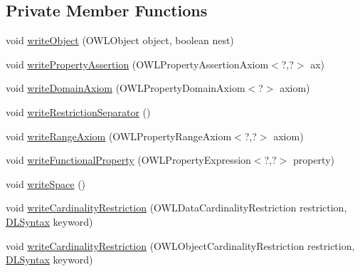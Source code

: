 \subsection*{Private Member Functions}
\begin{DoxyCompactItemize}
\item 
void \hyperlink{classuk_1_1ac_1_1manchester_1_1cs_1_1owlapi_1_1dlsyntax_1_1_d_l_syntax_object_renderer_a7c527eb066fc7968a25a907d0ff17556}{write\-Object} (O\-W\-L\-Object object, boolean nest)
\item 
void \hyperlink{classuk_1_1ac_1_1manchester_1_1cs_1_1owlapi_1_1dlsyntax_1_1_d_l_syntax_object_renderer_a010e7dc7a620747ab0d1276659905d87}{write\-Property\-Assertion} (O\-W\-L\-Property\-Assertion\-Axiom$<$?,?$>$ ax)
\item 
void \hyperlink{classuk_1_1ac_1_1manchester_1_1cs_1_1owlapi_1_1dlsyntax_1_1_d_l_syntax_object_renderer_ab97c5853612dd1b2d74799572f67f284}{write\-Domain\-Axiom} (O\-W\-L\-Property\-Domain\-Axiom$<$?$>$ axiom)
\item 
void \hyperlink{classuk_1_1ac_1_1manchester_1_1cs_1_1owlapi_1_1dlsyntax_1_1_d_l_syntax_object_renderer_a0934f412e95a40b712c2c0bebb4a4c35}{write\-Restriction\-Separator} ()
\item 
void \hyperlink{classuk_1_1ac_1_1manchester_1_1cs_1_1owlapi_1_1dlsyntax_1_1_d_l_syntax_object_renderer_ae16beea379abfc9b0b3ed4c8deee2921}{write\-Range\-Axiom} (O\-W\-L\-Property\-Range\-Axiom$<$?,?$>$ axiom)
\item 
void \hyperlink{classuk_1_1ac_1_1manchester_1_1cs_1_1owlapi_1_1dlsyntax_1_1_d_l_syntax_object_renderer_a1a5cdc270354bfe1a9de448de008d0eb}{write\-Functional\-Property} (O\-W\-L\-Property\-Expression$<$?,?$>$ property)
\item 
void \hyperlink{classuk_1_1ac_1_1manchester_1_1cs_1_1owlapi_1_1dlsyntax_1_1_d_l_syntax_object_renderer_ae97fe53c739b568dd43eb8a90e1fd3ca}{write\-Space} ()
\item 
void \hyperlink{classuk_1_1ac_1_1manchester_1_1cs_1_1owlapi_1_1dlsyntax_1_1_d_l_syntax_object_renderer_a91f8fbef16e0ee22bd456c33b4bcfd58}{write\-Cardinality\-Restriction} (O\-W\-L\-Data\-Cardinality\-Restriction restriction, \hyperlink{enumuk_1_1ac_1_1manchester_1_1cs_1_1owlapi_1_1dlsyntax_1_1_d_l_syntax}{D\-L\-Syntax} keyword)
\item 
void \hyperlink{classuk_1_1ac_1_1manchester_1_1cs_1_1owlapi_1_1dlsyntax_1_1_d_l_syntax_object_renderer_a7855fca45f28b6e945c1e8b9149f0b6d}{write\-Cardinality\-Restriction} (O\-W\-L\-Object\-Cardinality\-Restriction restriction, \hyperlink{enumuk_1_1ac_1_1manchester_1_1cs_1_1owlapi_1_1dlsyntax_1_1_d_l_syntax}{D\-L\-Syntax} keyword)

\end{DoxyCompactItemize}
